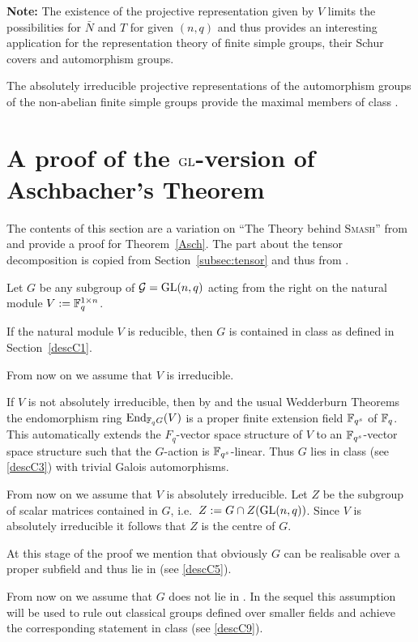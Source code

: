 \textbf{Note:} The existence of the projective representation given by $V$
limits the possibilities for $\bar N$ and $T$ for given $(n,q)$ and thus
provides an interesting application for the representation theory of finite
simple groups, their Schur covers and automorphism groups.

\medskip
\stru
The absolutely irreducible projective representations of the automorphism
groups of the non-abelian finite simple groups provide the maximal members
of class .


\section{A proof of the $\mathbf{\GL}$-version of Aschbacher's Theorem}
\label{AschProof}

The contents of this section are a variation on ``The Theory behind
\textsc{Smash}'' from \cite[Section~2]{smashnormal} and provide a proof for
Theorem~\ref{Asch}. The part about the tensor decomposition is copied
from Section~\ref{subsec:tensor} and thus from 
\cite[Section~6.6]{subfieldpaper}.

Let $G$ be any subgroup of $\GG = \GL(n,q)$ acting from the right on the
natural module $V := \mathbb{F}_q^{1 \times n}$.

If the natural module $V$ is reducible, then $G$ is contained in class 
as defined in Section~\ref{descC1}.

From now on we assume that $V$ is irreducible.

If $V$ is not absolutely irreducible, then by \cite[(29.13)]{CR0} and the 
usual Wedderburn Theorems
the endomorphism ring $\End_{\F_q G}(V)$ is a proper finite extension field
$\mathbb{F}_{q^s}$ of $\mathbb{F}_q$. This automatically extends the $F_q$-vector
space structure of $V$ to an $\mathbb{F}_{q^s}$-vector space structure
such that the $G$-action is $\mathbb{F}_{q^s}$-linear. Thus $G$ lies in class
 (see \ref{descC3}) with trivial Galois automorphisms.

From now on we assume that $V$ is absolutely irreducible. Let $Z$ be the
subgroup of scalar matrices contained in $G$, i.e.~$Z := G \cap
Z(\GL(n,q))$. Since $V$ is absolutely irreducible it follows that $Z$ is
the centre of $G$.

At this stage of the proof we mention that obviously $G$ can be
realisable over a proper subfield and thus lie in  (see
\ref{descC5}).

From now on we assume that $G$ does not lie in . In the sequel this 
assumption will be used to rule out classical groups defined over
smaller fields and achieve the corresponding statement in class 
(see \ref{descC9}).


